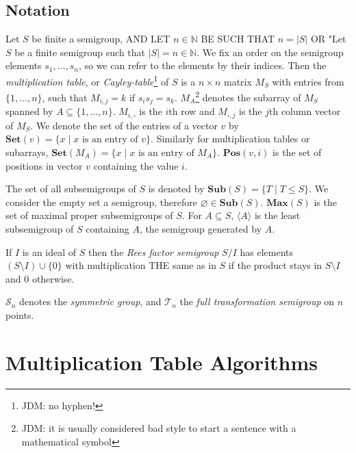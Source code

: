 \documentclass{amsart}
\newcommand{\cT}{{\mathcal T}}
\newcommand{\cS}{{\mathcal S}}
\newcommand{\Sub}{\mathbf{Sub}}
\newcommand{\Set}{\mathbf{Set}}
\newcommand{\Pos}{\mathbf{Pos}}
\newcommand{\Max}{\mathbf{Max}}
\theoremstyle{plain}
\theoremstyle{definition}
\begin{document}
\subsection{Notation}

Let $S$ be finite a semigroup, AND LET $n\in\mathbb{N}$ BE SUCH THAT $n=|S|$ 
OR "Let $S$ be a finite semigroup such that $|S|=n\in\mathbb{N}$.
We fix an order on the semigroup elements $s_1,\ldots, s_n$, so we can refer to the elements by their indices. 
Then the  \emph{multiplication table}, or \emph{Cayley-table}\footnote{JDM: no
hyphen!} of $S$ is a $n\times n$ matrix $M_S$ with entries from
$\{1,\ldots,n\}$, such that $M_{i,j}=k$ if $s_is_j=s_k$.
$M_A$\footnote{JDM: it is usually considered bad style to start a sentence with
a mathematical symbol} denotes the subarray of $M_S$ spanned by $A\subseteq\{1,\ldots,n\}$.
$M_{i,\square}$ is the $i$th row and $M_{\square,j}$ is the $j$th column vector of $M_S$.
We denote the set of the entries of a vector $v$ by $\Set(v)=\{x\mid x\text{ is
an entry of } v\}$.  Similarly for multiplication tables or subarrays,
$\Set(M_A)=\{x\mid x\text{ is an entry of } M_A\}$.  $\Pos(v,i)$ is the set of
positions in vector $v$ containing the value $i$.

The set of all subsemigroups of $S$ is denoted by $\Sub(S)=\big\{T\mid T\leq S
\big\}$.  We consider the empty set a semigroup, therefore
$\varnothing\in\Sub(S)$.  $\Max(S)$ is the set of maximal proper subsemigroups
of $S$.  For $A\subseteq S$, $\langle A\rangle$ is the least subsemigroup of $S$
containing $A$, the semigroup generated by $A$. 

If $I$ is an ideal of $S$ then the \emph{Rees factor semigroup} $S/I$ has
elements $(S\setminus I)\cup\{0\}$ with multiplication THE same as in $S$ if the
product stays in $S\setminus I$ and 0 otherwise.

$\cS_n$ denotes the \emph{symmetric group}, and $\cT_n$ the \emph{full transformation semigroup} on $n$ points.

\section{Multiplication Table Algorithms}
\label{sec:multab}
\end{document}
